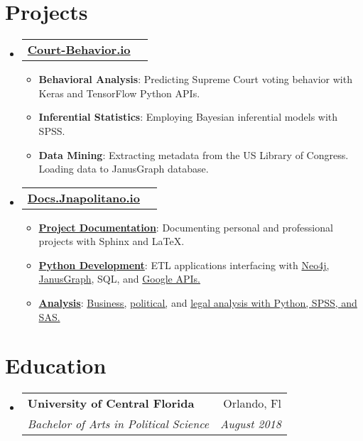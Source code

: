 \documentclass[letterpaper,11pt]{article}
\makeatletter
\newcommand{\resumeItem}[2]{
  \item\small{
    \textbf{#1}{: #2 \vspace{-0pt}}
  }
}
\newcommand{\resumeSubheading}[4]{
  \vspace{-1pt}\item
    \begin{tabular*}{0.97\textwidth}[t]{l@{\extracolsep{\fill}}r}
      \textbf{#1} & #2 \\
      \textit{\small#3} & \textit{\small #4} \\
    \end{tabular*}\vspace{-5pt}
}
\newcommand{\resumeProject}[2]{
  \vspace{-1pt}\item
    \begin{tabular*}{0.97\textwidth}[t]{l@{\extracolsep{\fill}}r}
      \textbf{#1} & #2 \\
    \end{tabular*}\vspace{-5pt}
}
\newcommand{\resumeSubHeadingListStart}{\begin{itemize}[leftmargin=*]}
\newcommand{\resumeSubHeadingListEnd}{\end{itemize}}
\newcommand{\resumeItemListStart}{\begin{itemize}}
\newcommand{\resumeItemListEnd}{\end{itemize}\vspace{-5pt}}
\makeatother
\begin{document}
{  \section{Projects}
    \resumeSubHeadingListStart
    \resumeProject
      {\href{https://court-behavior.io}{Court-Behavior.io}}{}
        \resumeItemListStart
          \resumeItem{Behavioral Analysis}
            {Predicting Supreme Court voting behavior with Keras and TensorFlow Python APIs.}
          \resumeItem{Inferential Statistics}
            {Employing Bayesian inferential models with SPSS.}
          \resumeItem{Data Mining}
            {Extracting metadata from the US Library of Congress.  Loading data to JanusGraph database.}
        \resumeItemListEnd
    \resumeProject
      {\href{docs.jnapolitano.io}{Docs.Jnapolitano.io}}{}
        \resumeItemListStart
          \resumeItem{\href{docs.jnapolitano.io}{Project Documentation}}
            {Documenting personal and professional projects with Sphinx and LaTeX.}
          \resumeItem{\href{https://docs.jnapolitano.io/index.html\#python-development}{Python Development}}
            {ETL applications interfacing with {\href{https://docs.jnapolitano.io/parts/python-development/neo4j/index.html}{Neo4j,}} {\href{https://docs.jnapolitano.io/parts/python-development/janus-graph/index.html}{JanusGraph}}, SQL, and {\href{https://docs.jnapolitano.io/parts/python-development/google/index.html}{Google APIs.}}}
          \resumeItem{\href{https://docs.jnapolitano.io/index.html\#analysis}{Analysis}}
            {{\href{https://docs.jnapolitano.io/parts/analysis/business-analysis/index.html}{Business,}} {\href{https://docs.jnapolitano.io/parts/analysis/political-analysis/index.html}{political,}} and {\href{https://docs.jnapolitano.io/parts/analysis/political-analysis/sup-court/index.html}{legal analysis with Python, SPSS, and SAS.}}}
          \resumeItemListEnd

  \resumeSubHeadingListEnd

  \section{Education}
    \resumeSubHeadingListStart
      \resumeSubheading
        {University of Central Florida}{Orlando, Fl}
        {Bachelor of Arts in Political Science}{August 2018}
    \resumeSubHeadingListEnd

}
\end{document}
